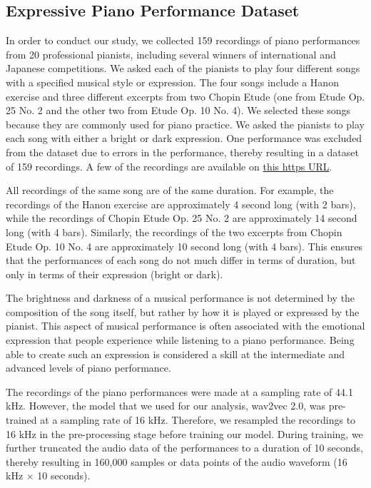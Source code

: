 \documentclass[manuscript,review,anonymous]{acmart}
\begin{document}
\subsection{Expressive Piano Performance Dataset}
In order to conduct our study, we collected 159 recordings of piano performances from 20 professional pianists, including several winners of international and Japanese competitions. 
We asked each of the pianists to play four different songs with a specified musical style or expression. 
The four songs include a Hanon exercise and three different excerpts from two Chopin Etude (one from Etude Op. 25 No. 2 and the other two from Etude Op. 10 No. 4). 
We selected these songs because they are commonly used for piano practice. 
We asked the pianists to play each song with either a bright or dark expression. 
One performance was excluded from the dataset due to errors in the performance, thereby resulting in a dataset of 159 recordings.
A few of the recordings are available on \href{https://drive.google.com/drive/folders/1xp3xK3R8Lk2Ju28Suqh3HeLBHwiNSn1E}{this https URL}.

All recordings of the same song are of the same duration. 
For example, the recordings of the Hanon exercise are approximately 4 second long (with 2 bars), while the recordings of Chopin Etude Op. 25 No. 2 are approximately 14 second long (with 4 bars). 
Similarly, the recordings of the two excerpts from Chopin Etude Op. 10 No. 4 are approximately 10 second long (with 4 bars). 
This ensures that the performances of each song do not much differ in terms of duration, but only in terms of their expression (bright or dark). 

The brightness and darkness of a musical performance is not determined by the composition of the song itself, but rather by how it is played or expressed by the pianist. 
This aspect of musical performance is often associated with the emotional expression that people experience while listening to a piano performance. 
Being able to create such an expression is considered a skill at the intermediate and advanced levels of piano performance. 

The recordings of the piano performances were made at a sampling rate of 44.1 kHz. 
However, the model that we used for our analysis, wav2vec 2.0, was pre-trained at a sampling rate of 16 kHz. 
Therefore, we resampled the recordings to 16 kHz in the pre-processing stage before training our model. 
During training, we further truncated the audio data of the performances to a duration of 10 seconds, thereby resulting in 160,000 samples or data points of the audio waveform (16 kHz $\times$ 10 seconds). 
\end{document}
